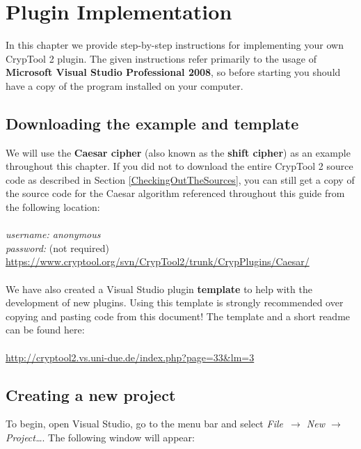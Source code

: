 \chapter{Plugin Implementation}
\label{sec:PluginImplementation}
In this chapter we provide step-by-step instructions for implementing your own CrypTool 2 plugin. The given instructions refer primarily to the usage of \textbf{Microsoft Visual Studio Professional 2008}, so before starting you should have a copy of the program installed on your computer. 

\section{Downloading the example and template}
\label{sec:DownloadingTheExampleAndTemplate}

We will use the \textbf{Caesar cipher} (also known as the \textbf{shift cipher}) as an example throughout this chapter. If you did not to download the entire CrypTool 2 source code as described in Section \ref{CheckingOutTheSources}, you can still get a copy of the source code for the Caesar algorithm referenced throughout this guide from the following location:\\\\
\textit{username: anonymous\\
password:} (not required)\\
\url{https://www.cryptool.org/svn/CrypTool2/trunk/CrypPlugins/Caesar/}\\\\
We have also created a Visual Studio plugin \textbf{template} to help with the development of new plugins. Using this template is strongly recommended over copying and pasting code from this document! The template and a short readme can be found here:\\\\
\url{http://cryptool2.vs.uni-due.de/index.php?page=33&lm=3}
\clearpage

\section{Creating a new project}
\label{sec:CreatingANewProject}

To begin, open Visual Studio, go to the menu bar and select \textit{File~$\rightarrow$ New $\rightarrow$ Project\ldots }. The following window will appear:

